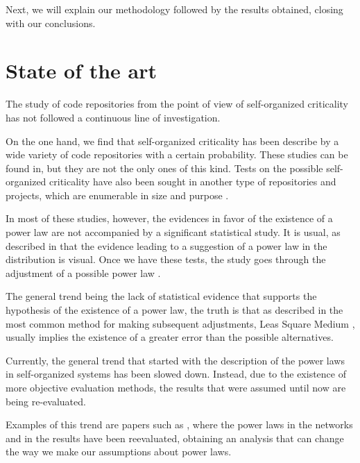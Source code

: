 \documentclass{article}
\begin{document}
Next, we will explain our methodology followed by the results
obtained, closing with our conclusions.



\section{State of the art}\label{soa}

The study of code repositories from the point of view of
self-organized criticality has not followed a continuous line of
investigation.

On the one hand, we find that self-organized criticality has been
describe by a wide variety of code repositories with a certain
probability. These studies can be found
in\cite{wu2007empirical,gorshenev2004punctuated}, but they are not the
only ones of this kind. Tests on the possible self-organized
criticality have also been sought in another type of repositories and
projects, which are enumerable in size and purpose
\cite{Merelo2016:repomining,merelo16:slash,merelo16:self,merelo2017self}.

In most of these studies, however, the evidences in favor of the
existence of a power law are not accompanied by a significant
statistical study. It is usual, as described in \cite{newman2005power}
that the evidence leading to a suggestion of a power law in the
distribution is visual. Once we have these tests, the study goes
through the adjustment of a possible power law
\cite{merelo2017self,arafat2009commit}.

The general trend being the lack of statistical evidence that supports
the hypothesis of the existence of a power law, the truth is that as
described in \cite{newman2005power, clauset2009power} the most common
method for making subsequent adjustments, Leas Square Medium
\cite{merelo2017self,arafat2009commit,merelo16:self}, usually implies
the existence of a greater error than the possible alternatives.

Currently, the general trend that started with the description of the
power laws in self-organized systems has been slowed down. Instead,
due to the existence of more objective evaluation methods, the results
that were assumed until now are being re-evaluated.

Examples of this trend are papers such as \cite{Holme2019,
  Broido2019}, where the power laws in the networks and in the results
have been reevaluated, obtaining an analysis that can change the way
we make our assumptions about power laws.
\end{document}
